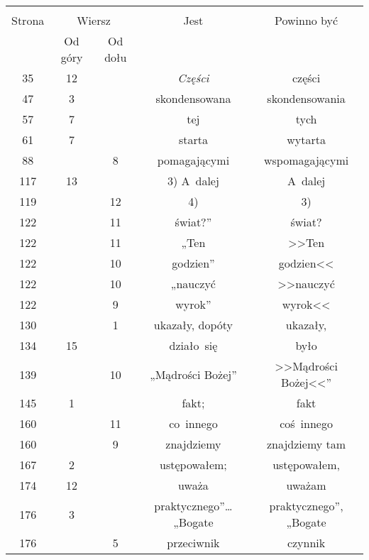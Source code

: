 \documentclass[a4paper,11pt]{article}
\begin{document}
\vspace{\spaceFour}







\begin{center}

  \begin{tabular}{|c|c|c|c|c|}
    \hline
    & \multicolumn{2}{c|}{} & & \\
    Strona & \multicolumn{2}{c|}{Wiersz} & Jest
                              & Powinno być \\ \cline{2-3}
    & Od góry & Od dołu & & \\
    \hline
    35  & 12 & & \textit{Części} & części \\
    47  &  3 & & skondensowana & skondensowania \\
    57  &  7 & & tej & tych \\
    61  &  7 & & starta & wytarta \\
    88  & &  8 & pomagającymi & wspomagającymi \\
    117 & 13 & & 3) A~dalej & A~dalej \\
    119 & & 12 & 4) & 3) \\
    122 & & 11 & świat?” & świat? \\
    122 & & 11 & „Ten & >>Ten \\
    122 & & 10 & godzien” & godzien<<  %
    \\
    122 & & 10 & „nauczyć & >>nauczyć \\
    122 & &  9 & wyrok” & wyrok<<  %
    \\
    130 & &  1 & ukazały, dopóty & ukazały, \\
    134 & 15 & & działo~się & było \\
    139 & & 10 & „Mądrości Bożej” & >>Mądrości Bożej<<”  %
    \\
    145 &  1 & & fakt; & fakt \\
    160 & & 11 & co~innego & coś~innego \\
    160 & &  9 & znajdziemy & znajdziemy tam \\
    167 &  2 & & ustępowałem; & ustępowałem, \\
    174 & 12 & & uważa & uważam \\
    176 &  3 & & praktycznego”\ldots „Bogate & praktycznego”, „Bogate \\
    176 & &  5 & przeciwnik & czynnik \\

\end{tabular}
\end{center}
\end{document}

